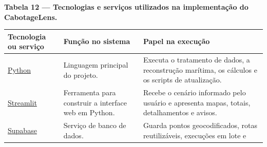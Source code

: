 \documentclass[brazil,]{article}
\newcommand{\keeptable}{\Needspace{0.64\textheight}}
\begin{document}
\keeptable
\textbf{Tabela 12 --- Tecnologias e serviços utilizados na implementação
do CabotageLens.}

\begin{longtable}[]{@{}lll@{}}
\toprule
\begin{minipage}[b]{0.30\columnwidth}\raggedright
Tecnologia ou serviço\strut
\end{minipage} & \begin{minipage}[b]{0.30\columnwidth}\raggedright
Função no sistema\strut
\end{minipage} & \begin{minipage}[b]{0.30\columnwidth}\raggedright
Papel na execução\strut
\end{minipage}\tabularnewline
\midrule
\endhead
\begin{minipage}[t]{0.30\columnwidth}\raggedright
\href{https://www.python.org/}{Python}\strut
\end{minipage} & \begin{minipage}[t]{0.30\columnwidth}\raggedright
Linguagem principal do projeto.\strut
\end{minipage} & \begin{minipage}[t]{0.30\columnwidth}\raggedright
Executa o tratamento de dados, a reconstrução marítima, os cálculos e os
scripts de atualização.\strut
\end{minipage}\tabularnewline
\begin{minipage}[t]{0.30\columnwidth}\raggedright
\href{https://streamlit.io/}{Streamlit}\strut
\end{minipage} & \begin{minipage}[t]{0.30\columnwidth}\raggedright
Ferramenta para construir a interface web em Python.\strut
\end{minipage} & \begin{minipage}[t]{0.30\columnwidth}\raggedright
Recebe o cenário informado pelo usuário e apresenta mapas, totais,
detalhamentos e avisos.\strut
\end{minipage}\tabularnewline
\begin{minipage}[t]{0.30\columnwidth}\raggedright
\href{https://supabase.com/}{Supabase}\strut
\end{minipage} & \begin{minipage}[t]{0.30\columnwidth}\raggedright
Serviço de banco de dados.\strut
\end{minipage} & \begin{minipage}[t]{0.30\columnwidth}\raggedright
Guarda pontos geocodificados, rotas reutilizáveis, execuções em lote e

\end{minipage}
\end{longtable}
\end{document}
